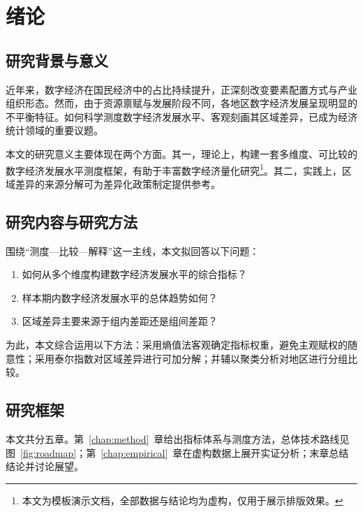 \chapter{绪论}
\label{chap:intro}

\section{研究背景与意义}

近年来，数字经济在国民经济中的占比持续提升，正深刻改变要素配置方式与产业组织形态。然而，由于资源禀赋与发展阶段不同，各地区数字经济发展呈现明显的不平衡特征\citep{xugc2023digital}。如何科学测度数字经济发展水平、客观刻画其区域差异，已成为经济统计领域的重要议题\citep{liwei2022region}。

本文的研究意义主要体现在两个方面。其一，理论上，构建一套多维度、可比较的数字经济发展水平测度框架，有助于丰富数字经济量化研究\footnote{本文为模板演示文档，全部数据与结论均为虚构，仅用于展示排版效果。}。其二，实践上，区域差异的来源分解可为差异化政策制定提供参考。

\section{研究内容与研究方法}

围绕“测度—比较—解释”这一主线，本文拟回答以下问题：

\begin{enumerate}[label=（\arabic*）]
    \item 如何从多个维度构建数字经济发展水平的综合指标？
    \item 样本期内数字经济发展水平的总体趋势如何？
    \item 区域差异主要来源于组内差距还是组间差距？
\end{enumerate}

为此，本文综合运用以下方法：采用熵值法客观确定指标权重，避免主观赋权的随意性；采用泰尔指数对区域差异进行可加分解；并辅以聚类分析对地区进行分组比较\citep{chen2019cluster}。

\section{研究框架}

本文共分五章。第~\ref{chap:method}~章给出指标体系与测度方法，总体技术路线见图~\ref{fig:roadmap}；第~\ref{chap:empirical}~章在虚构数据上展开实证分析；末章总结结论并讨论展望。
